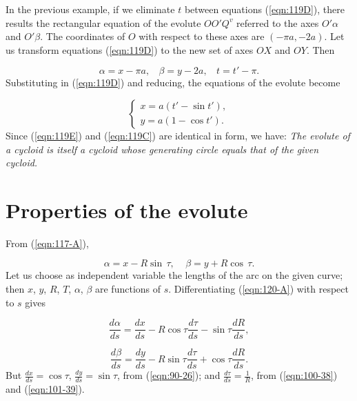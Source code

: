 \begin{remark}
{\rm
In the previous example,
if we eliminate $t$ between equations (\ref{eqn:119D}), there results 
the rectangular equation of the evolute $OO'Q^v$ referred to 
the axes $O'\alpha$ and $O'\beta$. The coordinates of $O$ with 
respect to these axes are $(-\pi a, -2a)$. Let us transform 
equations (\ref{eqn:119D}) to the new set of axes $OX$ and $OY$. Then

\[
\alpha = x -\pi a,\ \ \ \ \beta = y -2a,\ \ \ \ t = t' -\pi.
\]
Substituting in (\ref{eqn:119D}) and reducing, the 
equations of the evolute become

\begin{equation}
\label{eqn:119E}
\begin{cases} 
x = a(t' - \sin t'), \\ 
y = a(1 - \cos t').
\end{cases}
\end{equation}
Since (\ref{eqn:119E}) and (\ref{eqn:119C}) are identical in form, we have:
{\it The evolute of a cycloid is itself a cycloid whose 
generating circle equals that of the given cycloid.}
}
\end{remark}



\section{Properties of the evolute}
\label{sec:120}


From (\ref{eqn:117-A}), %

\begin{equation}
\label{eqn:120-A}
\alpha = x - R\sin\, \tau,\ \ \ \ \ 
\beta = y + R\cos\, \tau.
\end{equation}
Let us choose as independent variable the lengths of the arc 
on the given curve; then $x$, $y$, $R$, $T$, $\alpha$,
$\beta$ are functions of $s$. Differentiating 
(\ref{eqn:120-A}) with respect to $s$ gives

\begin{equation}
\label{eqn:120-B}
\frac{d\alpha}{ds} 
= \frac{dx}{ds} - R \cos \tau \frac{d\tau}{ds} - \sin \tau \frac{dR}{ds},
\end{equation}

\begin{equation}
\label{eqn:120-C}
\frac{d\beta}{ds} 
= \frac{dy}{ds} - R \sin \tau \frac{d\tau}{ds} + \cos \tau \frac{dR}{ds}.
\end{equation}
But $\frac{dx}{ds} = \cos \tau$, $\frac{dy}{ds} = \sin \tau$, from 
(\ref{eqn:90-26}); %
and $\frac{d\tau}{ds} = \frac{1}{R}$, from (\ref{eqn:100-38}) 
and (\ref{eqn:101-39}). %

